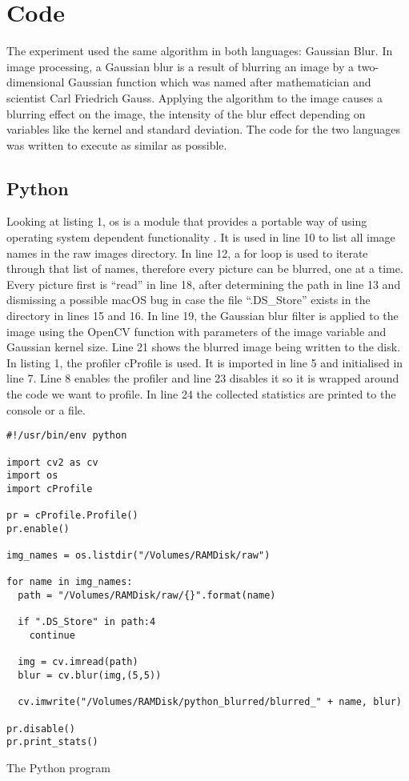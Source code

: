 \section{Code}
The experiment used the same algorithm in both languages: Gaussian Blur. In image processing, a Gaussian blur is a result of blurring an image by a two-dimensional Gaussian function which was named after mathematician and scientist Carl Friedrich Gauss. Applying the algorithm to the image causes a blurring effect on the image, the intensity of the blur effect depending on variables like the kernel and standard deviation. The code for the two languages was written to execute as similar as possible.

\subsection{Python}
Looking at listing 1, os is a module that provides a portable way of using operating system dependent functionality \cite{os}. It is used in line 10 to list all image names in the raw images directory. In line 12, a for loop is used to iterate through that list of names, therefore every picture can be blurred, one at a time. Every picture first is “read” in line 18, after determining the path in line 13 and dismissing a possible macOS bug in case the file “.DS\_Store” exists in the directory in lines 15 and 16. In line 19, the Gaussian blur filter is applied to the image using the OpenCV function with parameters of the image variable and Gaussian kernel size. Line 21 shows the blurred image being written to the disk.
In listing 1, the profiler cProfile is used. It is imported in line 5 and initialised in line 7. Line 8 enables the profiler and line 23 disables it so it is wrapped around the code we want to profile. In line 24 the collected statistics are printed to the console or a file.

\begin{listing}[H]
\begin{verbatim}
#!/usr/bin/env python

import cv2 as cv
import os
import cProfile

pr = cProfile.Profile()
pr.enable()

img_names = os.listdir("/Volumes/RAMDisk/raw")

for name in img_names:
  path = "/Volumes/RAMDisk/raw/{}".format(name)

  if ".DS_Store" in path:4
    continue

  img = cv.imread(path)
  blur = cv.blur(img,(5,5))

  cv.imwrite("/Volumes/RAMDisk/python_blurred/blurred_" + name, blur)

pr.disable()
pr.print_stats()
\end{verbatim}
\caption{The Python program}
\label{listing:python}
\end{listing}

